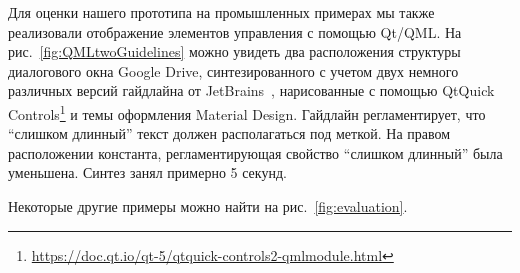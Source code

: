 
Для оценки нашего прототипа на промышленных примерах мы также реализовали отображение элементов управления с помощью Qt/QML.
На рис.~\ref{fig:QMLtwoGuidelines} можно увидеть два расположения структуры диалогового окна Google Drive, синтезированного
с учетом двух немного различных версий гайдлайна от JetBrains~\cite{JBG}, нарисованные с помощью  QtQuick Controls\footnote{\url{https://doc.qt.io/qt-5/qtquick-controls2-qmlmodule.html}} и темы оформления Material Design.
Гайдлайн регламентирует, что \enquote{слишком длинный} текст должен располагаться под меткой.
На правом расположении константа, регламентирующая свойство \enquote{слишком длинный} была уменьшена. Синтез занял примерно 5 секунд.


Некоторые другие примеры можно найти на рис.~\ref{fig:evaluation}.


%



